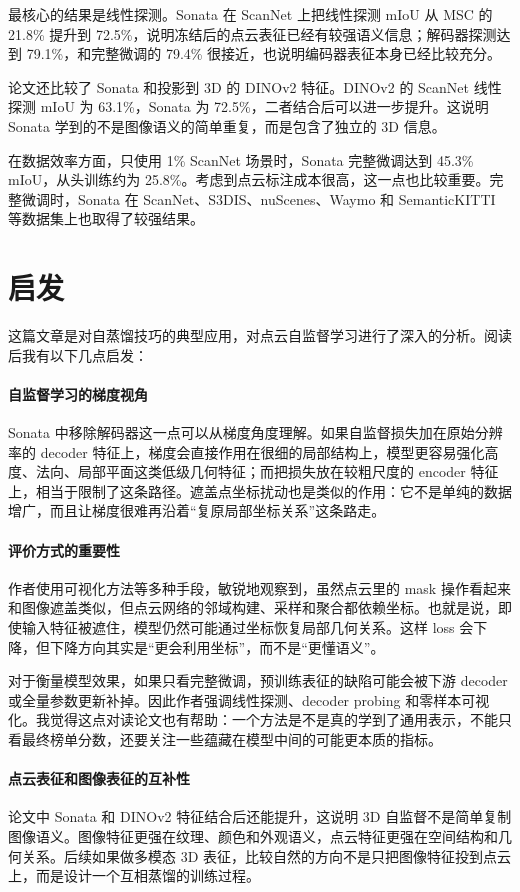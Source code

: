 \documentclass[a4paper,fontset=mac]{ctexart}
\begin{document}
最核心的结果是线性探测。Sonata 在 ScanNet 上把线性探测 mIoU 从 MSC 的 21.8\% 提升到 72.5\%，说明冻结后的点云表征已经有较强语义信息；解码器探测达到 79.1\%，和完整微调的 79.4\% 很接近，也说明编码器表征本身已经比较充分。

论文还比较了 Sonata 和投影到 3D 的 DINOv2 特征。DINOv2 的 ScanNet 线性探测 mIoU 为 63.1\%，Sonata 为 72.5\%，二者结合后可以进一步提升。这说明 Sonata 学到的不是图像语义的简单重复，而是包含了独立的 3D 信息。

在数据效率方面，只使用 1\% ScanNet 场景时，Sonata 完整微调达到 45.3\% mIoU，从头训练约为 25.8\%。考虑到点云标注成本很高，这一点也比较重要。完整微调时，Sonata 在 ScanNet、S3DIS、nuScenes、Waymo 和 SemanticKITTI 等数据集上也取得了较强结果。

\section{启发}

这篇文章是对自蒸馏技巧的典型应用，对点云自监督学习进行了深入的分析。阅读后我有以下几点启发：

\paragraph{自监督学习的梯度视角}

Sonata 中移除解码器这一点可以从梯度角度理解。如果自监督损失加在原始分辨率的 decoder 特征上，梯度会直接作用在很细的局部结构上，模型更容易强化高度、法向、局部平面这类低级几何特征；而把损失放在较粗尺度的 encoder 特征上，相当于限制了这条路径。遮盖点坐标扰动也是类似的作用：它不是单纯的数据增广，而且让梯度很难再沿着“复原局部坐标关系”这条路走。

\paragraph{评价方式的重要性}

作者使用可视化方法等多种手段，敏锐地观察到，虽然点云里的 mask 操作看起来和图像遮盖类似，但点云网络的邻域构建、采样和聚合都依赖坐标。也就是说，即使输入特征被遮住，模型仍然可能通过坐标恢复局部几何关系。这样 loss 会下降，但下降方向其实是“更会利用坐标”，而不是“更懂语义”。

对于衡量模型效果，如果只看完整微调，预训练表征的缺陷可能会被下游 decoder 或全量参数更新补掉。因此作者强调线性探测、decoder probing 和零样本可视化。我觉得这点对读论文也有帮助：一个方法是不是真的学到了通用表示，不能只看最终榜单分数，还要关注一些蕴藏在模型中间的可能更本质的指标。

\paragraph{点云表征和图像表征的互补性}

论文中 Sonata 和 DINOv2 特征结合后还能提升，这说明 3D 自监督不是简单复制图像语义。图像特征更强在纹理、颜色和外观语义，点云特征更强在空间结构和几何关系。后续如果做多模态 3D 表征，比较自然的方向不是只把图像特征投到点云上，而是设计一个互相蒸馏的训练过程。
\end{document}
